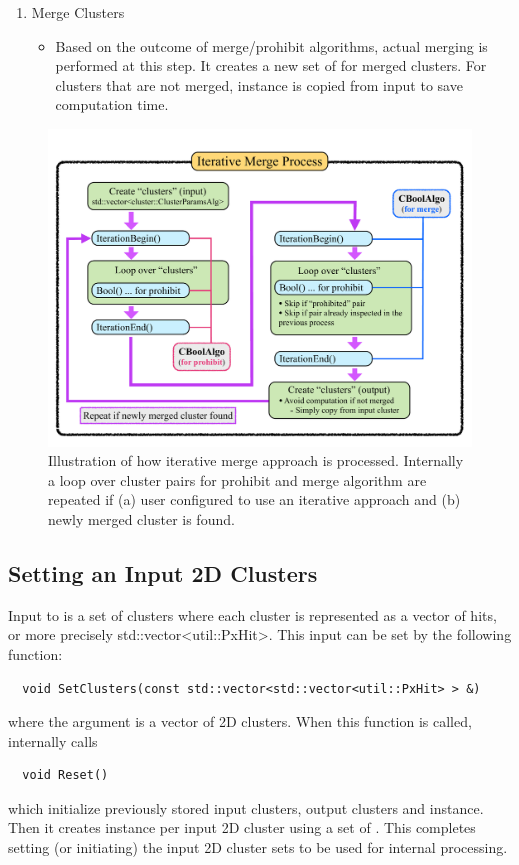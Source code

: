 \begin{enumerate}
\item Merge Clusters
  \begin{itemize}
    \item[] Based on the outcome of merge/prohibit {\cmalgo} algorithms, actual merging is performed at this step. It creates a new set of {\cpan} for merged clusters. For clusters that are not merged, {\cpan} instance is copied from input to save {\cpan} computation time.
  \end{itemize}

\end{enumerate}

\begin{figure}[ht]\begin{center}
\includegraphics[width=13cm]{./src/Pictures/IterativeMergeApproach.pdf}
\caption{Illustration of how iterative merge approach is processed. Internally a loop over cluster pairs for prohibit and merge algorithm are repeated if (a) user configured to use an iterative approach and (b) newly merged cluster is found.}
\label{sec:fmwk:cmerge:iterative_stream}
\end{center}\end{figure}


\subsection{Setting an Input 2D Clusters}
\label{sec:fmwk:cmerge:input}
Input to {\cmerge} is a set of clusters where each cluster is represented as a vector of hits, or more precisely {\ttfamily std::vector<util::PxHit>}. This input can be set by the following function:
\begin{lstlisting}
  void SetClusters(const std::vector<std::vector<util::PxHit> > &)
\end{lstlisting}
where the argument is a vector of 2D clusters. When this function is called, {\cmerge} internally calls
\begin{lstlisting}
  void Reset()
\end{lstlisting}
which initialize previously stored input clusters, output clusters and {\cbkeeper} instance.
Then it creates {\cpan} instance per input 2D cluster using a set of {\pxhit}.
This completes setting (or initiating) the input 2D cluster sets to be used for internal processing.


